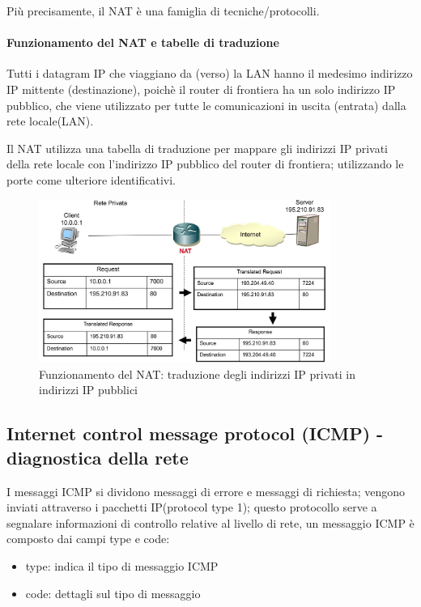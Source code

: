 Più precisamente, il NAT è una famiglia di tecniche/protocolli.

\paragraph{Funzionamento del NAT e tabelle di traduzione}

Tutti i datagram IP che viaggiano da (verso) la LAN hanno il medesimo indirizzo IP
mittente (destinazione), poichè il router di frontiera ha un solo indirizzo IP pubblico, che viene utilizzato per tutte le comunicazioni in uscita (entrata) dalla rete locale(LAN).

Il NAT utilizza una tabella di traduzione per mappare gli indirizzi IP privati della rete locale con l'indirizzo IP pubblico del router di frontiera; utilizzando le porte come ulteriore identificativi.

\begin{figure}[h!]
    \centering
    \includegraphics[width=0.85\textwidth]{images/nat.png}
    \caption{Funzionamento del NAT: traduzione degli indirizzi IP privati in indirizzi IP pubblici}
    \label{fig:nat}
\end{figure}

\newpage

\subsection{Internet control message protocol (ICMP) - diagnostica della rete}
I messaggi ICMP si dividono messaggi di errore e messaggi di richiesta; vengono inviati attraverso i pacchetti IP(protocol type 1);
questo protocollo serve a segnalare informazioni di controllo relative al livello di rete, un messaggio ICMP è composto dai campi type e code:
\begin{multicols}{2}
\begin{itemize}
    \item type: indica il tipo di messaggio ICMP
    \item code: dettagli sul tipo di messaggio
\end{itemize}
\end{multicols}


